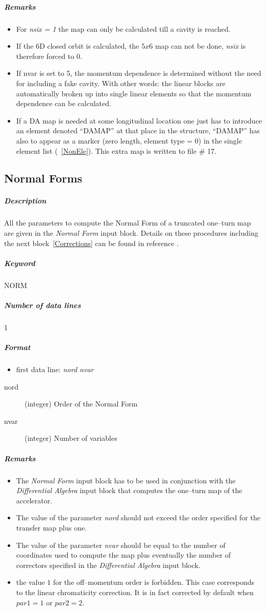 \documentclass[a4paper,11pt]{report}
\begin{document}
\subparagraph{Remarks}
\begin{itemize}
\item For {\em nsix = 1} \/the map can only be calculated till a
  cavity is reached.
\item If the 6D closed orbit is calculated, the $ 5x6 $ map can not be
  done, {\em nsix} \/is therefore forced to 0.
\item If nvar is set to 5, the momentum dependence is determined
  without the need for including a fake cavity. With other words: the
  linear blocks are automatically broken up into single linear
  elements so that the momentum dependence can be calculated.
\item If a DA map is needed at some longitudinal location one just has
  to introduce an element denoted ``DAMAP'' at that place in the
  structure, ``DAMAP'' has also to appear as a marker (zero length,
  element type = 0) in the single element list (~\ref{NonEle}).  This
  extra map is written to file \# 17.
\end{itemize}

\subsection{Normal Forms} \label{Normal}

\subparagraph{Description} All the parameters to compute the Normal
Form of a truncated one--turn map are given in the {\em Normal Form }
\/input block. Details on these procedures including the next
block~\ref{Corrections} can be found in reference \cite{Massimo}.

\subparagraph{Keyword} NORM \subparagraph{Number of data lines} 1

\subparagraph{Format}
\begin{itemize}
\item first data line: {\em nord nvar}
\end{itemize}

\begin{description}
\item [nord] (integer) Order of the Normal Form
\item [nvar] (integer) Number of variables
\end{description}

\subparagraph{Remarks}
\begin{itemize}
\item The {\em Normal Form } \/input block has to be used in
  conjunction with the {\em Differential Algebra } \/input block that
  computes the one--turn map of the accelerator.
\item The value of the parameter {\em nord} \/should not exceed the
  order specified for the transfer map plus one.
\item The value of the parameter {\em nvar} \/should be equal to the
  number of coordinates used to compute the map plus eventually the
  number of correctors specified in the {\em Differential Algebra }
  \/input block.
\item the value $1$ for the off--momentum order is forbidden. This
  case corresponds to the linear chromaticity correction. It is in
  fact corrected by default when $par1 =1$ or $par2 =2$.
\end{itemize}
\end{document}
